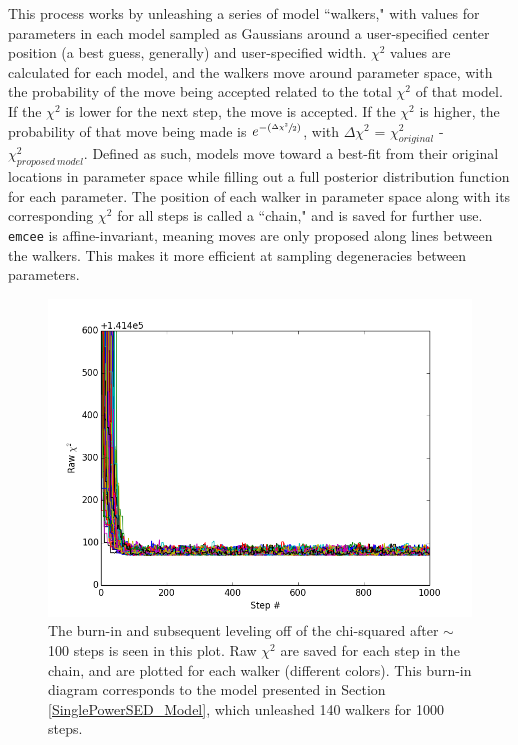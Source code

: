 This process works by unleashing a series of model ``walkers," with values for parameters in each model sampled as Gaussians around a user-specified center position (a best guess, generally) and user-specified width. $\chi^{2}$ values are calculated for each model, and the walkers move around parameter space, with the probability of the move being accepted related to the total $\chi^{2}$ of that model. If the $\chi^{2}$ is lower for the next step, the move is accepted. If the $\chi^{2}$ is higher, the probability of that move being made is $e^{-(\sfrac{\Delta \chi^{2}}{2})}$, with $\Delta \chi^{2}$ = $\chi^{2}_{original}$ - $\chi^{2}_{proposed~model}$. Defined as such, models move toward a best-fit from their original locations in parameter space while filling out a full posterior distribution function for each parameter. The position of each walker in parameter space along with its corresponding $\chi^{2}$ for all steps is called a ``chain," and is saved for further use. \texttt{emcee} is affine-invariant, meaning moves are only proposed along lines between the walkers. This makes it more efficient at sampling degeneracies between parameters. 

\begin{figure}
\centering
\includegraphics[width = 1\textwidth]{49CET_BurnIn_140x1000_Simplest.png}
\caption{The burn-in and subsequent leveling off of the chi-squared after $\sim$ 100 steps is seen in this plot. Raw $\chi^{2}$ are saved for each step in the chain, and are plotted for each walker (different colors). This burn-in diagram corresponds to the model presented in Section \ref{SinglePowerSED_Model}, which unleashed 140 walkers for 1000 steps.}
\label{fig:49CET_BurnIn}
\end{figure}

